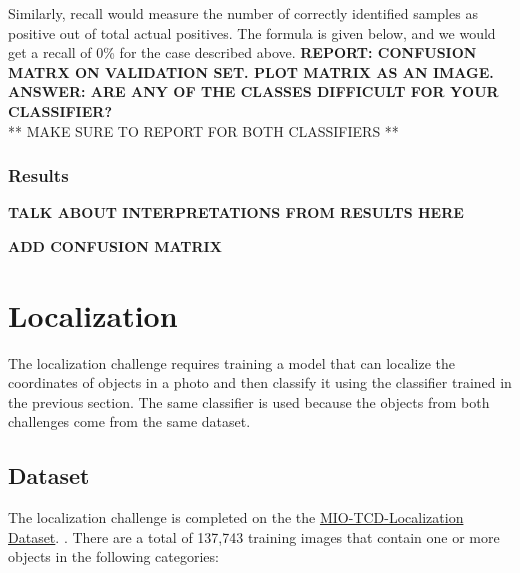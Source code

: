 \documentclass[12pt]{article}
\begin{document}
\medskip
\noindent Similarly, recall would measure the number of correctly identified samples as positive out of total actual positives. The formula is given below, and we would get a recall of 0\% for the case described above.
\textbf{REPORT: CONFUSION MATRX ON VALIDATION SET. PLOT MATRIX AS AN IMAGE. ANSWER: ARE ANY OF THE CLASSES DIFFICULT FOR YOUR CLASSIFIER?} \\

** MAKE SURE TO REPORT FOR BOTH CLASSIFIERS ** \\

\subsubsection{Results}

\textbf{TALK ABOUT INTERPRETATIONS FROM RESULTS HERE}

\textbf{ADD CONFUSION MATRIX}

\section{Localization}

The localization challenge requires training a model that can localize the coordinates of objects in a photo and then classify it using the classifier trained in the previous section. The same classifier is used because the objects from both challenges come from the same dataset. 

\subsection{Dataset}

The localization challenge is completed on the the \href{http://podoce.dinf.usherbrooke.ca/static/dataset/MIO-TCD-Localization.tar}{MIO-TCD-Localization Dataset}. \cite{MIO_TCD}. There are a total of 137,743 training images that contain one or more objects in the following categories: 
\end{document}
